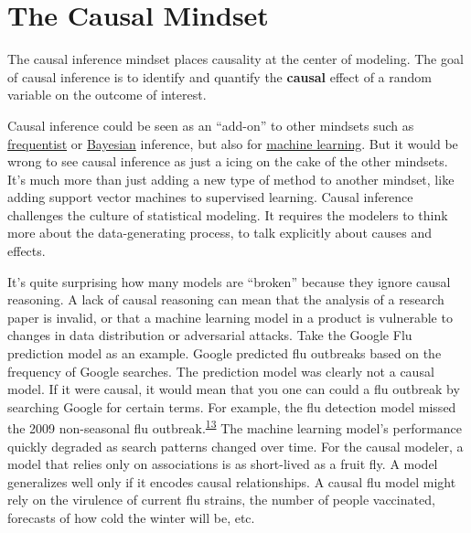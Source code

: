 \documentclass[
  10pt,
]{scrbook}
\begin{document}
\hypertarget{the-causal-mindset}{%
\section{The Causal Mindset}\label{the-causal-mindset}}

The causal inference mindset places causality at the center of modeling.
The goal of causal inference is to identify and quantify the \textbf{causal} effect of a random variable on the outcome of interest.

Causal inference could be seen as an ``add-on'' to other mindsets such as \protect\hyperlink{frequentism}{frequentist} or \protect\hyperlink{bayesian}{Bayesian} inference, but also for \protect\hyperlink{machine-learning}{machine learning}.
But it would be wrong to see causal inference as just a icing on the cake of the other mindsets.
It's much more than just adding a new type of method to another mindset, like adding support vector machines to supervised learning.
Causal inference challenges the culture of statistical modeling.
It requires the modelers to think more about the data-generating process, to talk explicitly about causes and effects.

It's quite surprising how many models are ``broken'' because they ignore causal reasoning.
A lack of causal reasoning can mean that the analysis of a research paper is invalid, or that a machine learning model in a product is vulnerable to changes in data distribution or adversarial attacks.
Take the Google Flu prediction model as an example.
Google predicted flu outbreaks based on the frequency of Google searches.
The prediction model was clearly not a causal model.
If it were causal, it would mean that you one can could a flu outbreak by searching Google for certain terms.
For example, the flu detection model missed the 2009 non-seasonal flu outbreak.\textsuperscript{\protect\hyperlink{ref-lazer2014parable}{13}}
The machine learning model's performance quickly degraded as search patterns changed over time.
For the causal modeler, a model that relies only on associations is as short-lived as a fruit fly.
A model generalizes well only if it encodes causal relationships.
A causal flu model might rely on the virulence of current flu strains, the number of people vaccinated, forecasts of how cold the winter will be, etc.
\end{document}
